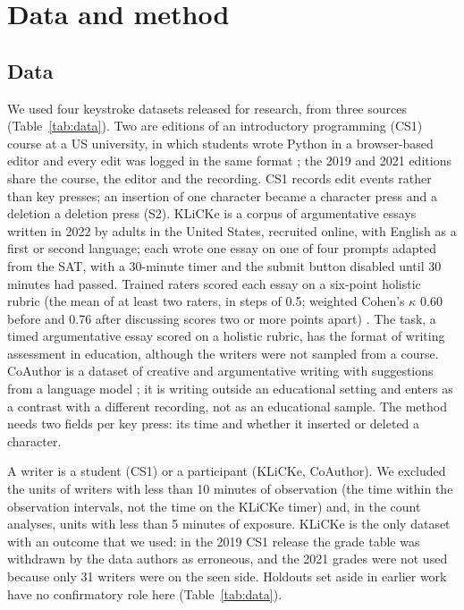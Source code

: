 \section{Data and method}
\label{sec:method}

\subsection{Data}
\label{sec:data}

We used four keystroke datasets released for research, from three sources (Table~\ref{tab:data}). Two are editions of an
introductory programming (CS1) course at a US university, in which students wrote Python in a browser-based editor and
every edit was logged in the same format \cite{edwards2023cs1}; the 2019 and 2021 editions share the course, the
editor and the recording. CS1 records edit events rather than key presses; an insertion of one character became a
character press and a deletion a deletion press (S2). KLiCKe \cite{tian2025klicke} is a corpus of argumentative essays
written in 2022 by adults in the United States, recruited online, with English as a first or second language; each
wrote one essay on one of four prompts adapted from the SAT, with a 30-minute timer and the submit button disabled until
30 minutes had passed. Trained raters scored each essay on a six-point holistic rubric (the mean of at least two raters, in
steps of 0.5; weighted Cohen's $\kappa$ 0.60 before and 0.76 after discussing scores two or more points apart)
\cite{tian2025klicke}. The task, a timed argumentative essay scored on a holistic rubric, has the format of writing
assessment in education, although the writers were not sampled from a course. CoAuthor is a dataset of creative and argumentative writing with suggestions from a language model
\cite{lee2022coauthor}; it is writing outside an educational setting and enters as a contrast with a different
recording, not as an educational sample. The method needs two fields per key press: its time and whether it inserted
or deleted a character.

A writer is a student (CS1) or a participant (KLiCKe, CoAuthor). We excluded the units of writers with less than 10
minutes of observation (the time within the observation intervals, not the time on the KLiCKe timer) and, in the count analyses, units with
less than 5 minutes of exposure. KLiCKe is the only dataset with an outcome that we used: in the 2019 CS1 release the
grade table was withdrawn by the data authors as erroneous, and the 2021 grades were not used because only 31 writers
were on the seen side. Holdouts set aside in earlier work have no confirmatory role here (Table~\ref{tab:data}).

